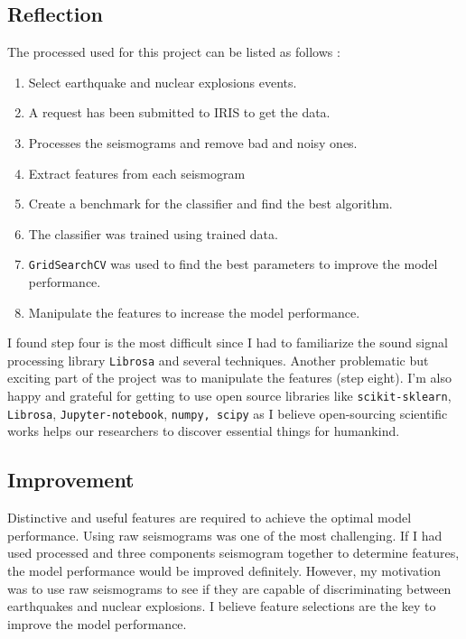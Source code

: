 \documentclass[12pt]{article}
\begin{document}
        \subsection{Reflection}
        The processed used for this project can be listed as follows :
        \begin{enumerate}
            \item Select earthquake and nuclear explosions events.
            \item A request has been submitted to IRIS to get the data.
            \item Processes the seismograms and remove bad and noisy ones.
            \item Extract features from each seismogram
            \item Create a benchmark for the classifier and find the best algorithm.
            \item The classifier was trained using trained data.
            \item \texttt{GridSearchCV} was used to find the best parameters to improve the model performance.
            \item Manipulate the features to increase the model performance. 
        \end{enumerate}
    
        I found step four is the most difficult since I had to familiarize the sound signal processing library \texttt{Librosa} and several techniques. Another problematic but exciting part of the project was to manipulate the features (step eight). I’m also happy and grateful for getting to use open source libraries like \texttt{scikit-sklearn}, \texttt{Librosa}, \texttt{Jupyter-notebook}, \texttt{numpy, scipy} as I believe open-sourcing scientific works helps our researchers to discover essential things for humankind.
    
        \subsection{Improvement}
        Distinctive and useful features are required to achieve the optimal model performance. Using raw seismograms was one of the most challenging. If I had used processed and three components seismogram together to determine features,  the model performance would be improved definitely. However, my motivation was to use raw seismograms to see if they are capable of discriminating between earthquakes and nuclear explosions. I believe feature selections are the key to improve the model performance.
        
        
        
        
        
\end{document}
